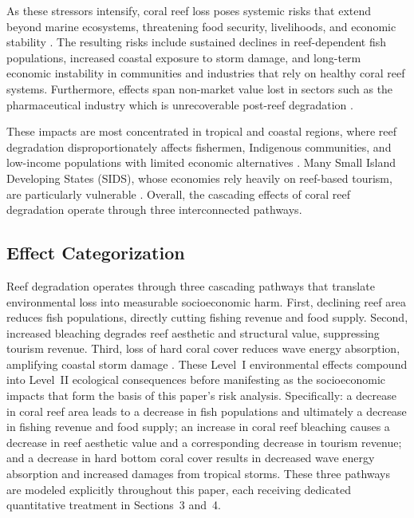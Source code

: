\documentclass[10pt,letterpaper]{article}
\begin{document}
As these stressors intensify, coral reef loss poses systemic risks that extend beyond marine ecosystems, threatening food security, livelihoods, and economic stability \cite{burke_reefs_risk_2011}. The resulting risks include sustained declines in reef-dependent fish populations, increased coastal exposure to storm damage, and long-term economic instability in communities and industries that rely on healthy coral reef systems. Furthermore, effects span non-market value lost in sectors such as the pharmaceutical industry which is unrecoverable post-reef degradation \cite{simpson1996, costello2006}.

These impacts are most concentrated in tropical and coastal regions, where reef degradation disproportionately affects fishermen, Indigenous communities, and low-income populations with limited economic alternatives \cite{teicher_2025}. Many Small Island Developing States (SIDS), whose economies rely heavily on reef-based tourism, are particularly vulnerable \cite{cesar_economics_2003}. Overall, the cascading effects of coral reef degradation operate through three interconnected pathways.

\subsection{Effect Categorization}

Reef degradation operates through three cascading pathways that translate environmental loss into measurable socioeconomic harm. First, declining reef area reduces fish populations, directly cutting fishing revenue and food supply. Second, increased bleaching degrades reef aesthetic and structural value, suppressing tourism revenue. Third, loss of hard coral cover reduces wave energy absorption, amplifying coastal storm damage \cite{ferrario_2014, storlazzi_2019}. These Level~I environmental effects compound into Level~II ecological consequences before manifesting as the socioeconomic impacts that form the basis of this paper's risk analysis. Specifically: a decrease in coral reef area leads to a decrease in fish populations and ultimately a decrease in fishing revenue and food supply; an increase in coral reef bleaching causes a decrease in reef aesthetic value and a corresponding decrease in tourism revenue; and a decrease in hard bottom coral cover results in decreased wave energy absorption and increased damages from tropical storms. These three pathways are modeled explicitly throughout this paper, each receiving dedicated quantitative treatment in Sections~3 and~4.
\end{document}
